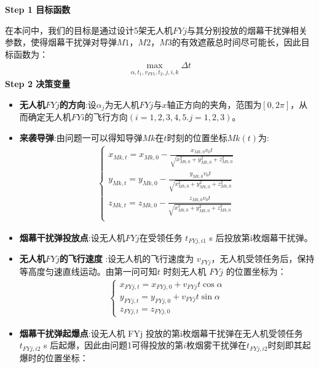 \documentclass[../main.tex]{subfiles}
\begin{document}
\noindent \textbf{Step 1 目标函数}
\par 在本问中，我们的目标是通过设计5架无人机$FYj$与其分别投放的烟幕干扰弹相关参数，使得烟幕干扰弹对导弹$M1$，$M2$，$M3$的有效遮蔽总时间尽可能长，因此目标函数为：
\begin{align}\label{11.1}
  \underset{\alpha ,t_1,v_{FY1},t_2,j,i,k}{\max}\Delta t
\end{align}
\noindent \textbf{Step 2 决策变量}

\begin{itemize}
\item \textbf{无人机$FYj$的方向}:设$\alpha_j$为无人机$FYj$与$x$轴正方向的夹角，范围为$\left[ 0,2\pi \right] $，从而确定无人机$FYi$的飞行方向$(i=1,2,3,4,5.j=1,2,3)$。

\item \textbf{来袭导弹}:由问题一可以得知导弹$Mk$在$t$时刻的位置坐标$Mk\left( t \right)$为:
\begin{align}
	\left\{ \begin{array}{l}
	x_{Mk,t}=x_{Mk,0}-\frac{x_{Mk,0}v_0t}{\sqrt{x_{Mk,0}^{2}+y_{Mk,0}^{2}+z_{Mk,0}^{2}}}\\
	y_{Mk,t}=y_{Mk,0}-\frac{y_{Mk,0}v_0t}{\sqrt{x_{Mk,0}^{2}+y_{Mk,0}^{2}+z_{Mk,0}^{2}}}\\
	z_{Mk,t}=z_{Mk,0}-\frac{z_{Mk,0}v_0t}{\sqrt{x_{Mk,0}^{2}+y_{Mk,0}^{2}+z_{Mk,0}^{2}}}\\
\end{array} \right. 
\end{align}
\item \textbf{烟幕干扰弹投放点}:设无人机$FYj$在受领任务 \( t_{FYj,i1} \) s 后投放第i枚烟幕干扰弹。 
\item  \textbf{无人机$FYj$的飞行速度} :设无人机的飞行速度为 \( v_{FYj} \)，无人机受领任务后，保持等高度匀速直线运动。由第一问可知\( t \) 时刻无人机 \( FYj \) 的位置坐标为：
\begin{align}\label{11.3}
  \begin{cases}
x_{FYj,t} = x_{FYj,0} + v_{FYj} t \cos\alpha \\
y_{FYj,t} = y_{FYj,0} + v_{FYj} t \sin\alpha \\
z_{FYj,t} = z_{FYj,0}
\end{cases}
\end{align}
\item \textbf{烟幕干扰弹起爆点}:设无人机 FYj 投放的第i枚烟幕干扰弹在无人机受领任务 \( t_{FYj,i2} \) s 后起爆，因此由问题1可得投放的第$i$枚烟雾干扰弹在$t_{FYj,i2}$时刻即其起爆时的位置坐标：

\end{itemize}
\end{document}
